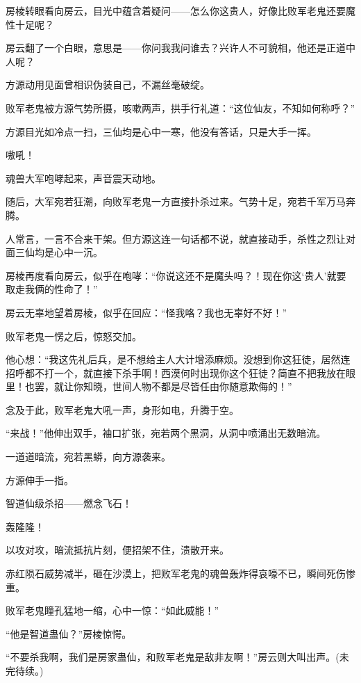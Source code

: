 \begin{this_body}
房棱转眼看向房云，目光中蕴含着疑问——怎么你这贵人，好像比败军老鬼还要魔性十足呢？

房云翻了一个白眼，意思是——你问我我问谁去？兴许人不可貌相，他还是正道中人呢？

方源动用见面曾相识伪装自己，不漏丝毫破绽。

败军老鬼被方源气势所摄，咳嗽两声，拱手行礼道：“这位仙友，不知如何称呼？”

方源目光如冷点一扫，三仙均是心中一寒，他没有答话，只是大手一挥。

嗷吼！

魂兽大军咆哮起来，声音震天动地。

随后，大军宛若狂潮，向败军老鬼一方直接扑杀过来。气势十足，宛若千军万马奔腾。

人常言，一言不合来干架。但方源这连一句话都不说，就直接动手，杀性之烈让对面三仙均是心中一沉。

房棱再度看向房云，似乎在咆哮：“你说这还不是魔头吗？！现在你这‘贵人’就要取走我俩的性命了！”

房云无辜地望着房棱，似乎在回应：“怪我咯？我也无辜好不好！”

败军老鬼一愣之后，惊怒交加。

他心想：“我这先礼后兵，是不想给主人大计增添麻烦。没想到你这狂徒，居然连招呼都不打一个，就直接下杀手啊！西漠何时出现你这个狂徒？简直不把我放在眼里！也罢，就让你知晓，世间人物不都是尽皆任由你随意欺侮的！”

念及于此，败军老鬼大吼一声，身形如电，升腾于空。

“来战！”他伸出双手，袖口扩张，宛若两个黑洞，从洞中喷涌出无数暗流。

一道道暗流，宛若黑蟒，向方源袭来。

方源伸手一指。

智道仙级杀招——燃念飞石！

轰隆隆！

以攻对攻，暗流抵抗片刻，便招架不住，溃散开来。

赤红陨石威势减半，砸在沙漠上，把败军老鬼的魂兽轰炸得哀嚎不已，瞬间死伤惨重。

败军老鬼瞳孔猛地一缩，心中一惊：“如此威能！”

“他是智道蛊仙？”房棱惊愕。

“不要杀我啊，我们是房家蛊仙，和败军老鬼是敌非友啊！”房云则大叫出声。(未完待续。)

\end{this_body}

